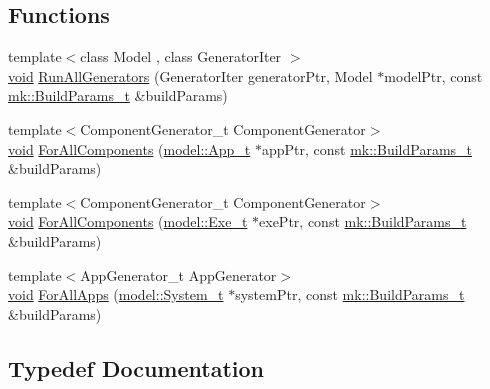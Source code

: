 \subsection*{Functions}
\begin{DoxyCompactItemize}
\item 
{\footnotesize template$<$class Model , class Generator\+Iter $>$ }\\\hyperlink{_t_e_m_p_l_a_t_e__cdef_8h_ac9c84fa68bbad002983e35ce3663c686}{void} \hyperlink{namespacegenerator_a75689fb7f5a2d48d6da8c56d8d3d4327}{Run\+All\+Generators} (Generator\+Iter generator\+Ptr, Model $\ast$model\+Ptr, const \hyperlink{structmk_1_1_build_params__t}{mk\+::\+Build\+Params\+\_\+t} \&build\+Params)
\item 
{\footnotesize template$<$Component\+Generator\+\_\+t Component\+Generator$>$ }\\\hyperlink{_t_e_m_p_l_a_t_e__cdef_8h_ac9c84fa68bbad002983e35ce3663c686}{void} \hyperlink{namespacegenerator_a3859a40e31eb24261f869a27362a50a0}{For\+All\+Components} (\hyperlink{structmodel_1_1_app__t}{model\+::\+App\+\_\+t} $\ast$app\+Ptr, const \hyperlink{structmk_1_1_build_params__t}{mk\+::\+Build\+Params\+\_\+t} \&build\+Params)
\item 
{\footnotesize template$<$Component\+Generator\+\_\+t Component\+Generator$>$ }\\\hyperlink{_t_e_m_p_l_a_t_e__cdef_8h_ac9c84fa68bbad002983e35ce3663c686}{void} \hyperlink{namespacegenerator_a53a0b3c8cf21e374d1eeb53ea181f6d3}{For\+All\+Components} (\hyperlink{structmodel_1_1_exe__t}{model\+::\+Exe\+\_\+t} $\ast$exe\+Ptr, const \hyperlink{structmk_1_1_build_params__t}{mk\+::\+Build\+Params\+\_\+t} \&build\+Params)
\item 
{\footnotesize template$<$App\+Generator\+\_\+t App\+Generator$>$ }\\\hyperlink{_t_e_m_p_l_a_t_e__cdef_8h_ac9c84fa68bbad002983e35ce3663c686}{void} \hyperlink{namespacegenerator_a23d2e6a5c30c8ab8201dd4ebd6d74563}{For\+All\+Apps} (\hyperlink{structmodel_1_1_system__t}{model\+::\+System\+\_\+t} $\ast$system\+Ptr, const \hyperlink{structmk_1_1_build_params__t}{mk\+::\+Build\+Params\+\_\+t} \&build\+Params)
\end{DoxyCompactItemize}


\subsection{Typedef Documentation}
